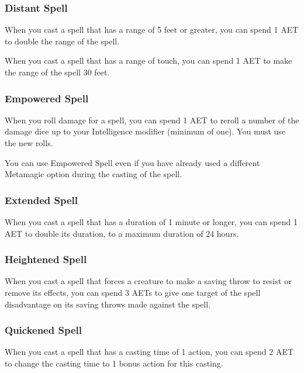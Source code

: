 \subsubsection{Distant Spell}

When you cast a spell that has a range of 5 feet or greater, you can spend 1 AET to double the range of the spell.

When you cast a spell that has a range of touch, you can spend 1 AET to make the range of the spell 30 feet.

\subsubsection{Empowered Spell}

When you roll damage for a spell, you can spend 1 AET to reroll a number of the damage dice up to your Intelligence modifier (minimum of one). You must use the new rolls.

You can use Empowered Spell even if you have already used a different Metamagic option during the casting of the spell.

\subsubsection{Extended Spell}

When you cast a spell that has a duration of 1 minute or longer, you can spend 1 AET to double its duration, to a maximum duration of 24 hours.

\subsubsection{Heightened Spell}

When you cast a spell that forces a creature to make a saving throw to resist or remove its effects, you can spend 3 AETs to give one target of the spell disadvantage on its saving throws made against the spell.

\subsubsection{Quickened Spell}

When you cast a spell that has a casting time of 1 action, you can spend 2 AET to change the casting time to 1 bonus action for this casting.

